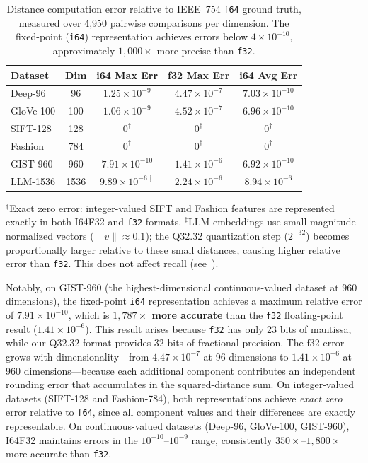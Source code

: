 \documentclass[10pt,journal]{IEEEtran}
\begin{document}
\begin{table}[t]
  \centering
  \caption{Distance computation error relative to IEEE~754 \texttt{f64} ground truth, measured over 4{,}950 pairwise comparisons per dimension. The fixed-point (\texttt{i64}) representation achieves errors below $4 \times 10^{-10}$, approximately $1{,}000\times$ more precise than \texttt{f32}.}
  \label{tab:error}
  \begin{tabular}{lcccc}
    \toprule
    \textbf{Dataset} & \textbf{Dim} & \textbf{i64 Max Err} & \textbf{f32 Max Err} & \textbf{i64 Avg Err} \\
    \midrule
    Deep-96   & 96  & $1.25\times10^{-9}$ & $4.47\times10^{-7}$ & $7.03\times10^{-10}$ \\
    GloVe-100 & 100 & $1.06\times10^{-9}$ & $4.52\times10^{-7}$ & $6.96\times10^{-10}$ \\
    SIFT-128  & 128 & $0^{\dagger}$       & $0^{\dagger}$       & $0^{\dagger}$ \\
    Fashion   & 784 & $0^{\dagger}$       & $0^{\dagger}$       & $0^{\dagger}$ \\
    GIST-960  & 960 & $7.91\times10^{-10}$ & $1.41\times10^{-6}$ & $6.92\times10^{-10}$ \\
    LLM-1536  & 1536 & $9.89\times10^{-6{\ddagger}}$ & $2.24\times10^{-6}$ & $8.94\times10^{-6}$ \\
    \bottomrule
  \end{tabular}
  \vspace{1mm}
  {\footnotesize $^{\dagger}$Exact zero error: integer-valued SIFT and Fashion features are represented exactly in both I64F32 and \texttt{f32} formats. $^{\ddagger}$LLM embeddings use small-magnitude normalized vectors ($\|v\| \approx 0.1$); the Q32.32 quantization step ($2^{-32}$) becomes proportionally larger relative to these small distances, causing higher relative error than \texttt{f32}. This does not affect recall (see~).}
\end{table}

Notably, on GIST-960 (the highest-dimensional continuous-valued dataset at 960 dimensions), the fixed-point \texttt{i64} representation achieves a maximum relative error of $7.91 \times 10^{-10}$, which is \textbf{$1{,}787\times$ more accurate} than the \texttt{f32} floating-point result ($1.41 \times 10^{-6}$). This result arises because \texttt{f32} has only 23 bits of mantissa, while our Q32.32 format provides 32 bits of fractional precision. The f32 error grows with dimensionality---from $4.47 \times 10^{-7}$ at 96 dimensions to $1.41 \times 10^{-6}$ at 960 dimensions---because each additional component contributes an independent rounding error that accumulates in the squared-distance sum. On integer-valued datasets (SIFT-128 and Fashion-784), both representations achieve \emph{exact zero} error relative to \texttt{f64}, since all component values and their differences are exactly representable. On continuous-valued datasets (Deep-96, GloVe-100, GIST-960), I64F32 maintains errors in the $10^{-10}$--$10^{-9}$ range, consistently $350\times$--$1{,}800\times$ more accurate than \texttt{f32}.
\end{document}
